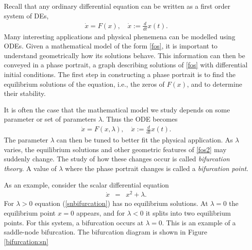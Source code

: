 \label{lab:Bifurcations}

Recall that any ordinary differential equation can be written as a first order system of DEs, 
\begin{align}
\dot{x} = F(x), \quad \dot{x} := \frac{d}{dt}x(t).\label{fos}
\end{align}
Many interesting applications and physical phenemena can be modelled using ODEs. Given a mathematical model of the form \eqref{fos}, it is important to understand geometrically how its solutions behave. This information can then be conveyed in a phase portrait, a graph describing solutions of \eqref{fos} with differential initial conditions. The first step in constructing a phase portrait is to find the equilibrium solutions of the equation, i.e., the zeros of $F(x)$, and to determine their stability. 

It is often the case that the mathematical model we study depends on some parameter or set of parameters $\lambda$. Thus the ODE becomes 
\begin{align}
\dot{x} = F(x,\lambda), \quad \dot{x} := \frac{d}{dt}x(t).\label{fos2}
\end{align}
The parameter $\lambda$ can then be tuned to better fit the physical application. As $\lambda$ varies, the equilibrium solutions and other geometric features of \eqref{fos2} may suddenly change. The study of how these changes occur is called \emph{bifurcation theory}. A value of $\lambda$ where the phase portrait changes is called a \emph{bifurcation point}.

As an example, consider the scalar differential equation 
\begin{eqnarray}
\dot{x} &=& x^2 + \lambda. \label{snbifurcation}
\end{eqnarray}
For $\lambda > 0$ equation (\ref{snbifurcation}) has no equilibrium solutions. At $\lambda = 0$ the equilibrium point $x=0$ appears, and for $\lambda < 0$ it splits into two equilibrium points. For this system, a bifurcation occurs at $\lambda = 0$. This is an example of a saddle-node bifurcation. The bifurcation diagram is shown in Figure \ref{bifurcation:sn} 


